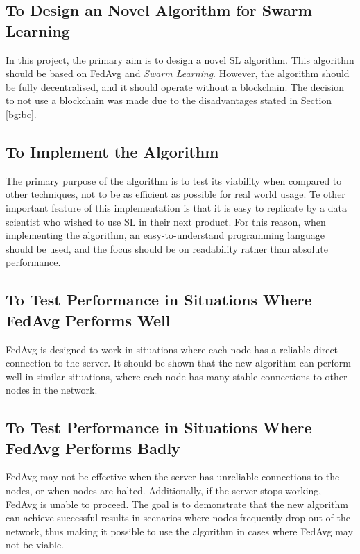 \subsection{To Design an Novel Algorithm for Swarm Learning}
In this project, the primary aim is to design a novel SL algorithm. This algorithm should be based on FedAvg and \emph{Swarm Learning}. However, the algorithm should be fully decentralised, and it should operate without a blockchain. The decision to not use a blockchain was made due to the disadvantages stated in Section \ref{bg:bc}.

\subsection{To Implement the Algorithm}
The primary purpose of the algorithm is to test its viability when compared to other techniques, not to be as efficient as possible for real world usage. Te other important feature of this implementation is that it is easy to replicate by a data scientist who wished to use SL in their next product. For this reason, when implementing the algorithm, an easy-to-understand programming language should be used, and the focus should be on readability rather than absolute performance.

\subsection{To Test Performance in Situations Where FedAvg Performs Well}
FedAvg is designed to work in situations where each node has a reliable direct connection to the server. It should be shown that the new algorithm can perform well in similar situations, where each node has many stable connections to other nodes in the network.

\subsection{To Test Performance in Situations Where FedAvg Performs Badly}
FedAvg may not be effective when the server has unreliable connections to the nodes, or when nodes are halted. Additionally, if the server stops working, FedAvg is unable to proceed. The goal is to demonstrate that the new algorithm can achieve successful results in scenarios where nodes frequently drop out of the network, thus making it possible to use the algorithm in cases where FedAvg may not be viable.